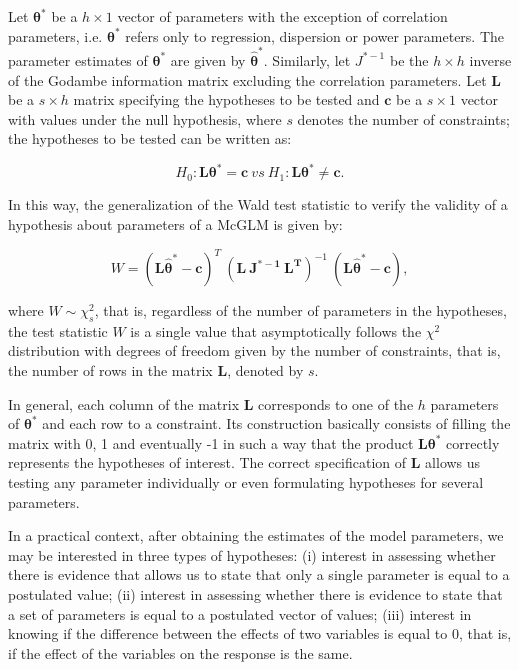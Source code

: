 \documentclass[AMA,STIX1COL]{WileyNJD-v2}
\begin{document}

Let $\boldsymbol{\theta^{*}}$ be a $h \times 1$ vector of parameters with the exception of correlation parameters, i.e. $\boldsymbol{\theta^{*}}$ refers only to regression, dispersion or power parameters. 
The parameter estimates of $\boldsymbol{\theta^{*}}$ are given by $\boldsymbol{\hat\theta^{*}}$. Similarly, let $J^{\boldsymbol{*}-1}$ be the $h \times h$ inverse of the Godambe information matrix excluding the correlation parameters. Let $\boldsymbol{L}$ be a $s \times h$ matrix specifying the hypotheses to be tested and $\boldsymbol{c}$ be a $s \times 1$ vector with values under the null hypothesis, where $s$ denotes the number of constraints; the hypotheses to be tested can be written as:

\begin{equation}
\label{eq:hipoteses_wald}
H_0: \boldsymbol{L}\boldsymbol{\theta^{*}} = \boldsymbol{c} \ vs \ H_1: \boldsymbol{L}\boldsymbol{\theta^{*}} \neq \boldsymbol{c}. 
\end{equation}

\noindent In this way, the generalization of the Wald test statistic to verify the validity of a hypothesis about parameters of a McGLM is given by:

$$
W = (\boldsymbol{L\hat\theta^{*}} - \boldsymbol{c})^T \ (\boldsymbol{L \ J^{\boldsymbol{*}-1} \ L^T})^{-1} \ (\boldsymbol{L\hat\theta^{*}} - \boldsymbol{c}),
$$

\noindent where $W \sim \chi^2_s$, that is, regardless of the number of parameters in the hypotheses, the test statistic $W$ is a single value that asymptotically follows the $\chi^2$ distribution with degrees of freedom given by the number of constraints, that is, the number of rows in the matrix $\boldsymbol{L}$, denoted by $s$.

In general, each column of the matrix $\boldsymbol{L}$ corresponds to one of the $h$ parameters of $\boldsymbol{\theta^{*}}$ and each row to a constraint. Its construction basically consists of filling the matrix with 0, 1 and eventually -1 in such a way that the product $\boldsymbol{L}\boldsymbol{\theta^{*}}$ correctly represents the hypotheses of interest. The correct specification of $\boldsymbol{L}$ allows us testing any parameter individually or even formulating hypotheses for several parameters.

In a practical context, after obtaining the estimates of the model parameters, we may be interested in three types of hypotheses: (i) interest in assessing whether there is evidence that allows us to state that only a single parameter is equal to a postulated value; (ii) interest in assessing whether there is evidence to state that a set of parameters is equal to a postulated vector of values; (iii) interest in knowing if the difference between the effects of two variables is equal to 0, that is, if the effect of the variables on the response is the same.
\end{document}
